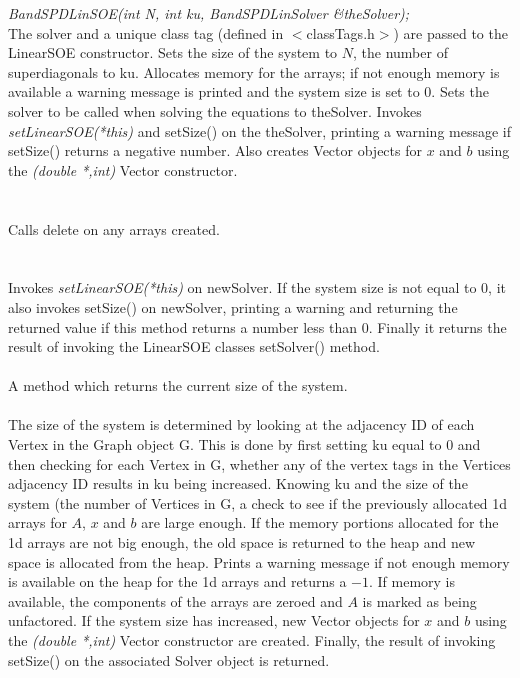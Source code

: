 {\em BandSPDLinSOE(int N, int ku, BandSPDLinSolver \&theSolver);}\\
The \p solver and a unique class tag (defined in $<$classTags.h$>$)
are passed to the LinearSOE constructor. 
Sets the size of the system to $N$, the number of superdiagonals to 
\p ku. Allocates memory for the arrays; if not enough
memory is available a warning message is printed and the system size
is set to $0$. Sets the solver to be called when solving the
equations to \p theSolver. Invokes {\em setLinearSOE(*this)} and
setSize() on the \p theSolver, printing a warning message if
setSize() returns a negative number. Also creates Vector objects
for $x$ and $b$ using the {\em (double *,int)} Vector constructor. \\


 \\
\\ 
Calls delete on any arrays created. \\

  \\
\\
Invokes {\em setLinearSOE(*this)} on \p newSolver.
If the system size is not equal to $0$, it also invokes setSize()
on \p newSolver, printing a warning and returning the returned value if this
method returns a number less than $0$. Finally it returns the result
of invoking the LinearSOE classes setSolver() method. \\

 \\
A method which returns the current size of the system. \\

 \\ 
The size of the system is determined by looking at the adjacency ID of
each Vertex in the Graph object \p G. This is done by first setting
\p ku equal to $0$ and then checking for each Vertex
in \p G, whether any of the vertex tags in the Vertices adjacency
ID results in \p ku being increased. Knowing \p ku and the size
of the system (the number of Vertices in \p G, a check to see if
the previously allocated 1d arrays for $A$, $x$ and $b$ are large
enough. If the memory portions allocated for the 1d arrays are not big
enough, the old space is returned to the heap and new space is
allocated from the heap. Prints a warning message if not enough
memory is available on the heap for the 1d arrays and returns a
$-1$. If memory is available, the components of the arrays are zeroed
and $A$ is marked as being unfactored. If the system size has
increased, new Vector objects for $x$ and $b$ using the {\em (double
*,int)} Vector constructor are created. Finally, the result of
invoking setSize() on the associated Solver object is
returned. \\ 


